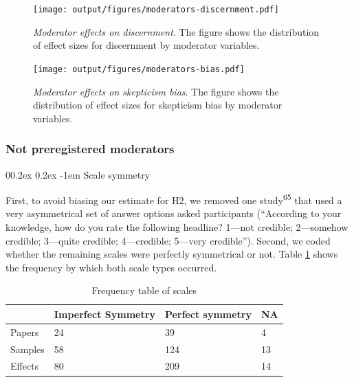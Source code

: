 \documentclass[
  man]{apa6}
\makeatletter
\let\oldparagraph\paragraph
\renewcommand{\paragraph}{
    \@ifstar
      \xxxParagraphStar
      \xxxParagraphNoStar
  }
\newcommand{\xxxParagraphStar}[1]{\oldparagraph*{#1}\mbox{}}
\newcommand{\xxxParagraphNoStar}[1]{\oldparagraph{#1}\mbox{}}
\renewcommand{\paragraph}{\@startsection{paragraph}{4}{\parindent}%
  {0\baselineskip \@plus 0.2ex \@minus 0.2ex}%
  {-1em}%
  {\normalfont\normalsize\bfseries\itshape\typesectitle}}
\makeatother
\begin{document}
\begin{figure}
\centering
\texttt{[image: output/figures/moderators-discernment.pdf]}
\caption{\label{fig:moderators-discernment}\emph{Moderator effects on discernment}. The figure shows the distribution of effect sizes for discernment by moderator variables.}
\end{figure}



\begin{figure}
\centering
\texttt{[image: output/figures/moderators-bias.pdf]}
\caption{\label{fig:moderators-bias}\emph{Moderator effects on skepticism bias}. The figure shows the distribution of effect sizes for skepticism bias by moderator variables.}
\end{figure}

\subsubsection{Not preregistered moderators}\label{not-preregistered-moderators}

\paragraph{Scale symmetry}\label{scale-symmetry}

First, to avoid biasing our estimate for H2, we removed one study\textsuperscript{65} that used a very asymmetrical set of answer options asked participants (``According to your knowledge, how do you rate the following headline? 1---not credible; 2---somehow credible; 3---quite credible; 4---credible; 5---very credible''). Second, we coded whether the remaining scales were perfectly symmetrical or not. Table \ref{tab:n-symmetry} shows the frequency by which both scale types occurred.

\begin{table}[tbp]

\begin{center}
\begin{threeparttable}

\caption{\label{tab:n-symmetry}Frequency table of scales}

\begin{tabular}{llll}
\toprule
 & \multicolumn{1}{c}{Imperfect Symmetry} & \multicolumn{1}{c}{Perfect symmetry} & \multicolumn{1}{c}{NA}\\
\midrule
Papers & 24 & 39 & 4\\
Samples & 58 & 124 & 13\\
Effects & 80 & 209 & 14\\
\bottomrule
\end{tabular}

\end{threeparttable}
\end{center}

\end{table}
\end{document}
